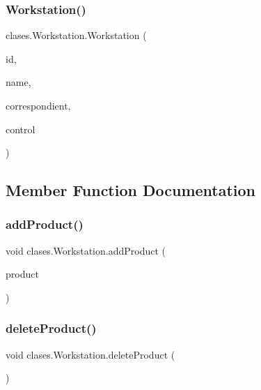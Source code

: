 \subsubsection{\texorpdfstring{Workstation()}{Workstation()}}
{\footnotesize\ttfamily clases.\+Workstation.\+Workstation (\begin{DoxyParamCaption}\item[{int}]{id,  }\item[{String}]{name,  }\item[{int}]{correspondient,  }\item[{\mbox{\hyperlink{classcontrol_1_1_control_vehicles}{Control\+Vehicles}}}]{control }\end{DoxyParamCaption})}



\subsection{Member Function Documentation}
\mbox{\label{classclases_1_1_workstation_aa5bcfb9b65f5aa9c78018e6eef6d1e15}} 
\subsubsection{\texorpdfstring{add\+Product()}{addProduct()}}
{\footnotesize\ttfamily void clases.\+Workstation.\+add\+Product (\begin{DoxyParamCaption}\item[{\mbox{\hyperlink{classclases_1_1_product}{Product}}}]{product }\end{DoxyParamCaption})}

\mbox{\label{classclases_1_1_workstation_a0fd86ec18770db6098c19c62fd4370d4}} 
\subsubsection{\texorpdfstring{delete\+Product()}{deleteProduct()}}
{\footnotesize\ttfamily void clases.\+Workstation.\+delete\+Product (\begin{DoxyParamCaption}{ }\end{DoxyParamCaption})}


